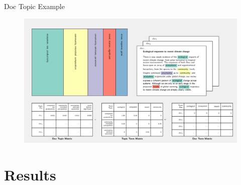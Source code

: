 \documentclass[9pt, aspectratio=169]{beamer}
\begin{document}
\begin{frame}{Doc Topic Example}
\begin{figure}
	\includegraphics[width=0.8\linewidth]{../plots/single_doc_3_536594.pdf}
\end{figure}

\end{frame}

\section{Results}
\frame{\tableofcontents[currentsection]}
\end{document}
